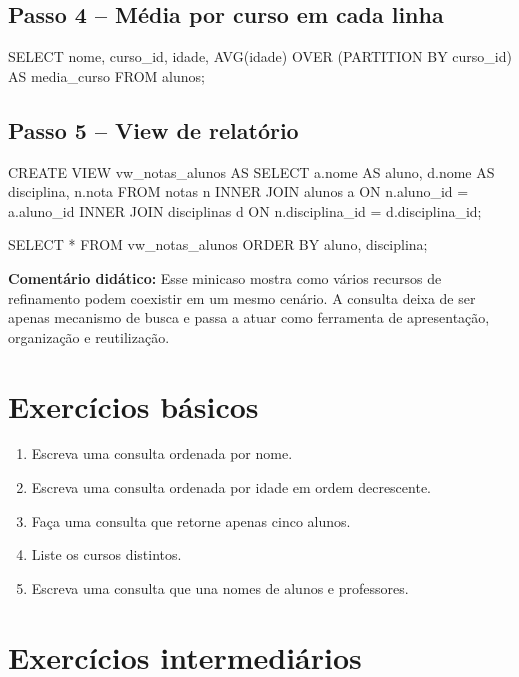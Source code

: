 \subsection*{Passo 4 -- Média por curso em cada linha}

\begin{sqlcode}
SELECT
    nome,
    curso_id,
    idade,
    AVG(idade) OVER (PARTITION BY curso_id) AS media_curso
FROM alunos;
\end{sqlcode}

\subsection*{Passo 5 -- View de relatório}

\begin{sqlcode}
CREATE VIEW vw_notas_alunos AS
SELECT
    a.nome AS aluno,
    d.nome AS disciplina,
    n.nota
FROM notas n
INNER JOIN alunos a
    ON n.aluno_id = a.aluno_id
INNER JOIN disciplinas d
    ON n.disciplina_id = d.disciplina_id;
\end{sqlcode}

\begin{sqlcode}
SELECT *
FROM vw_notas_alunos
ORDER BY aluno, disciplina;
\end{sqlcode}

\textbf{Comentário didático:}
Esse minicaso mostra como vários recursos de refinamento podem coexistir em um mesmo cenário. A consulta deixa de ser apenas mecanismo de busca e passa a atuar como ferramenta de apresentação, organização e reutilização.

\section{Exercícios básicos}

\begin{enumerate}
    \item Escreva uma consulta ordenada por nome.
    \item Escreva uma consulta ordenada por idade em ordem decrescente.
    \item Faça uma consulta que retorne apenas cinco alunos.
    \item Liste os cursos distintos.
    \item Escreva uma consulta que una nomes de alunos e professores.
\end{enumerate}

\section{Exercícios intermediários}

